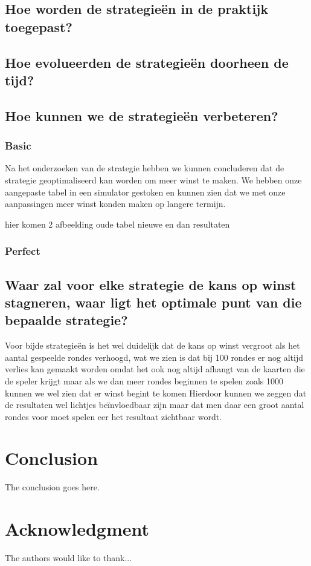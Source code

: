 \documentclass[conference]{IEEEtran}
\begin{document}
\subsection{Hoe worden de strategieën in de praktijk toegepast?}

\subsection{Hoe evolueerden de strategieën doorheen de tijd?}

\subsection{Hoe kunnen we de strategieën verbeteren?}
\subsubsection{Basic}
Na het onderzoeken van de strategie hebben we kunnen concluderen dat de strategie geoptimaliseerd kan worden om meer winst te maken.
We hebben onze aangepaste tabel in een simulator gestoken en kunnen zien dat we met onze aanpassingen meer winst konden maken op langere termijn.

hier komen 2 afbeelding oude tabel nieuwe en dan resultaten
\subsubsection{Perfect}

\subsection{ Waar zal voor elke strategie de kans op winst stagneren, waar ligt het optimale punt van die bepaalde strategie?}
Voor bijde strategieën is het wel duidelijk dat de kans op winst vergroot als het aantal gespeelde rondes verhoogd, wat we zien is dat bij 100 rondes er nog altijd verlies kan gemaakt worden omdat het ook nog altijd afhangt van de kaarten die de speler krijgt maar als we dan meer rondes beginnen te spelen zoals 1000 kunnen we wel zien dat er winst begint te komen Hierdoor kunnen we zeggen dat de resultaten wel lichtjes beïnvloedbaar zijn maar dat men daar een groot aantal rondes voor moet spelen eer het resultaat zichtbaar wordt. 
\section{Conclusion}
The conclusion goes here.

\section*{Acknowledgment}

The authors would like to thank...

\end{document}
